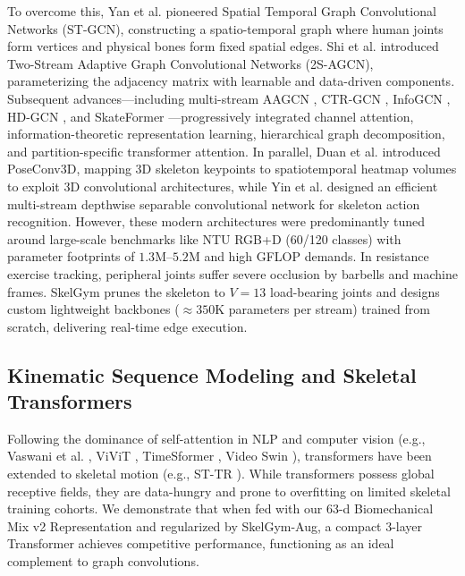 \documentclass[runningheads]{llncs}
\begin{document}
To overcome this, Yan et al. \cite{yan2018} pioneered Spatial Temporal Graph Convolutional Networks (ST-GCN), constructing a spatio-temporal graph where human joints form vertices and physical bones form fixed spatial edges. Shi et al. \cite{shi2019two} introduced Two-Stream Adaptive Graph Convolutional Networks (2S-AGCN), parameterizing the adjacency matrix with learnable and data-driven components. Subsequent advances---including multi-stream AAGCN \cite{shi2020skeleton}, CTR-GCN \cite{chen2021channel}, InfoGCN \cite{chi2022infogcn}, HD-GCN \cite{lee2023hdgcn}, and SkateFormer \cite{zheng2024skateformer}---progressively integrated channel attention, information-theoretic representation learning, hierarchical graph decomposition, and partition-specific transformer attention. In parallel, Duan et al. \cite{duan2022} introduced PoseConv3D, mapping 3D skeleton keypoints to spatiotemporal heatmap volumes to exploit 3D convolutional architectures, while Yin et al. \cite{yin2023} designed an efficient multi-stream depthwise separable convolutional network for skeleton action recognition. However, these modern architectures were predominantly tuned around large-scale benchmarks like NTU RGB+D (60/120 classes) with parameter footprints of $1.3\text{M}$--$5.2\text{M}$ and high GFLOP demands. In resistance exercise tracking, peripheral joints suffer severe occlusion by barbells and machine frames. SkelGym prunes the skeleton to $V=13$ load-bearing joints and designs custom lightweight backbones ($\approx 350\text{K}$ parameters per stream) trained from scratch, delivering real-time edge execution.

\subsection{Kinematic Sequence Modeling and Skeletal Transformers}
Following the dominance of self-attention in NLP and computer vision (e.g., Vaswani et al. \cite{vaswani2017}, ViViT \cite{arnab2021}, TimeSformer \cite{bertasius2021}, Video Swin \cite{liu2022video}), transformers have been extended to skeletal motion (e.g., ST-TR \cite{plizzari2021sttr}). While transformers possess global receptive fields, they are data-hungry and prone to overfitting on limited skeletal training cohorts. We demonstrate that when fed with our 63-d Biomechanical Mix v2 Representation and regularized by SkelGym-Aug, a compact 3-layer Transformer achieves competitive performance, functioning as an ideal complement to graph convolutions.
\end{document}

